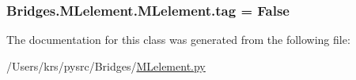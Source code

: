 \subsubsection[{tag}]{\setlength{\rightskip}{0pt plus 5cm}Bridges.\+M\+Lelement.\+M\+Lelement.\+tag = False\hspace{0.3cm}{\ttfamily [static]}}\label{class_bridges_1_1_m_lelement_1_1_m_lelement_adb11c5e159bc78f59daf34b2ae3c5a58}


The documentation for this class was generated from the following file\+:\begin{DoxyCompactItemize}
\item 
/\+Users/krs/pysrc/\+Bridges/\hyperlink{_m_lelement_8py}{M\+Lelement.\+py}\end{DoxyCompactItemize}
